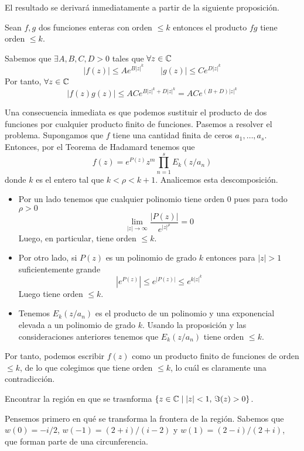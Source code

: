 \documentclass[twoside]{article}
\begin{document}
\begin{solucion}
El resultado se derivará inmediatamente a partir de la siguiente proposición. 
\begin{prop}
Sean $f,g$ dos funciones enteras con orden $\leq k$ entonces el producto $fg$ tiene orden $\leq k$.
\end{prop}
\begin{dem}
Sabemos que $\exists A,B,C,D>0$ tales que $\forall z\in \mathbb{C}$
$$
|f(z)|\leq Ae^{B|z|^k} \qquad |g(z)|\leq Ce^{D|z|^k}
$$
Por tanto, $\forall z \in \mathbb{C}$
$$
|f(z)g(z)| \leq ACe^{B|z|^k+D|z|^k} = ACe^{(B+D)|z|^k}
$$
\end{dem}
Una consecuencia inmediata es que podemos sustituir el producto de dos funciones por cualquier producto finito de funciones. Pasemos a resolver el problema. Supongamos que $f$ tiene una cantidad finita de ceros $a_1,\dotsc,a_s$. Entonces, por el Teorema de Hadamard tenemos que
$$
f(z)=e^{P(z)}z^m\prod_{n=1}^s E_k(z/a_n)
$$
donde $k$ es el entero tal que $k<\rho<k+1$. Analicemos esta descomposición. 
\begin{itemize}
\item Por un lado tenemos que cualquier polinomio tiene orden $0$ pues para todo $\rho>0$
$$
\lim_{|z|\to\infty} \frac{|P(z)|}{e^{|z|^\rho}} = 0
$$
Luego, en particular, tiene orden $\leq k$.
\item Por otro lado, si $P(z)$ es un polinomio de grado $k$ entonces para $|z|>1$ suficientemente grande
$$
|e^{P(z)}|\leq e^{|P(z)|}\leq e^{k|z|^k}
$$
Luego tiene orden $\leq k$. 
\item Tenemos $E_k(z/a_n)$ es el producto de un polinomio y una exponencial elevada a un polinomio de grado $k$. Usando la proposición y las consideraciones anteriores tenemos que $E_k(z/a_n)$ tiene orden $\leq k$. 
\end{itemize}
Por tanto, podemos escribir $f(z)$ como un producto finito de funciones de orden $\leq k$, de lo que colegimos que tiene orden $\leq k$, lo cuál es claramente una contradicción.
\end{solucion}
\newpage
\begin{ejercicio}{8}
Encontrar la región en que se trasnforma $\{z\in\mathbb{C}\mid |z|<1,\,\Im(z)>0\}$.
\end{ejercicio}
\begin{solucion}
Pensemos primero en qué se transforma la frontera de la región. Sabemos que $w(0)=-i/2$, $w(-1) = (2+i)/(i-2)$ y $w(1)= (2-i)/(2+i)$, que forman parte de una circunferencia. 
\end{solucion}
\newpage
\end{document}
